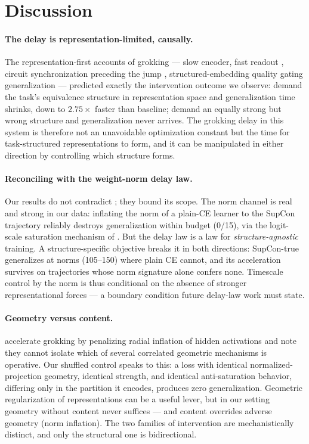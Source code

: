 \documentclass[11pt]{article}
\begin{document}
\section{Discussion}

\paragraph{The delay is representation-limited, causally.}
The representation-first accounts of grokking --- slow encoder, fast readout
\citep{twospeeds2026}, circuit synchronization preceding the jump \citep{circuitsync2026},
structured-embedding quality gating generalization \citep{liu2022towards} --- predicted exactly
the intervention outcome we observe: demand the task's equivalence structure in representation
space and generalization time shrinks, down to $2.75\times$ faster than baseline; demand an
equally strong but wrong structure and generalization never arrives. The grokking delay in this
system is therefore not an unavoidable optimization constant but the time for task-structured
representations to form, and it can be manipulated in either direction by controlling
which structure forms.

\paragraph{Reconciling with the weight-norm delay law.}
Our results do not contradict \citet{weightnormdelay2026}; they bound its scope. The norm channel
is real and strong in our data: inflating the norm of a plain-CE learner to the SupCon trajectory
reliably destroys generalization within budget (0/15), via the logit-scale saturation mechanism
of \citet{logitscale2026}. But the delay law is a law for \emph{structure-agnostic} training.
A structure-specific objective breaks it in both directions: SupCon-true generalizes at norms
(105--150) where plain CE cannot, and its acceleration survives on trajectories whose norm
signature alone confers none. Timescale control by the norm is thus conditional on the absence
of stronger representational forces --- a boundary condition future delay-law work must state.

\paragraph{Geometry versus content.}
\citet{radialsuppression2026} accelerate grokking by penalizing radial inflation of hidden
activations and note they cannot isolate which of several correlated geometric mechanisms is
operative. Our shuffled control speaks to this: a loss with identical normalized-projection
geometry, identical strength, and identical anti-saturation behavior, differing only in the
partition it encodes, produces zero generalization. Geometric regularization of representations
can be a useful lever, but in our setting geometry without content never suffices --- and content
overrides adverse geometry (norm inflation). The two families of intervention are
mechanistically distinct, and only the structural one is bidirectional.
\end{document}
